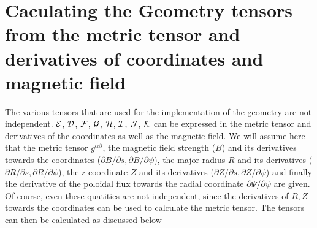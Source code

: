 \section{Caculating the Geometry tensors from the metric tensor and derivatives of coordinates
and magnetic field} 

The various tensors that are used for the implementation of the geometry are not independent. 
${\cal E}$, ${\cal D}$, ${\cal F}$, ${\cal G}$, ${\cal H}$, ${\cal I}$, ${\cal J}$, ${\cal K}$ 
can be expressed in the metric tensor and derivatives of the 
coordinates as well as the magnetic field. We will assume here that the metric tensor $g^{\alpha 
\beta}$, the magnetic field strength ($B$) and its derivatives towards the coordinates (${\partial 
B / \partial s}, \partial B / \partial \psi$), the major radius $R$ and its derivatives 
($\partial R / \partial s, \partial R / \partial \psi$), the z-coordinate $Z$ and its 
derivatives ($\partial Z / \partial s, \partial Z / \partial \psi$) and finally the 
derivative of the poloidal flux towards the radial coordinate $\partial \Psi / \partial \psi$ 
are given. Of course, even these quatities are not independent, since the derivatives of $R,Z$ towards 
the coordinates can be used to calculate the metric tensor. 
The tensors can then be calculated as discussed below 

